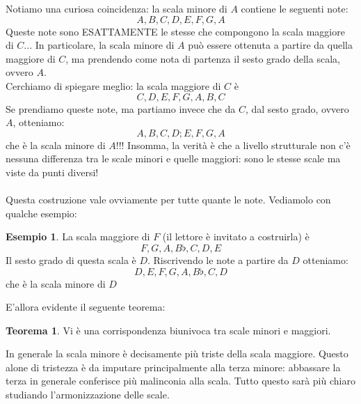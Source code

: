 \documentclass[12pt,a4paper]{report}
\theoremstyle{definition}
\theoremstyle{Theorem}
\newtheorem{Theo}[Def]{Teorema}
\theoremstyle{definition}
\newtheorem{Ex}[Def]{Esempio}
\theoremstyle{definition}
\theoremstyle{definition}
\begin{document}
	 		 Notiamo una curiosa coincidenza: la scala minore di $A$ contiene le seguenti note: 
	 		 $$A,B,C,D,E,F,G,A$$
	 		 Queste note sono ESATTAMENTE le stesse che compongono la scala maggiore di $C$... In particolare, la scala minore di $A$ può essere ottenuta a partire da quella maggiore di $C$, ma prendendo come nota di partenza il sesto grado della scala, ovvero $A$.\\
	 		 Cerchiamo di spiegare meglio: la scala maggiore di $C$ è
	 		$$C,D,E,F,G,A,B,C$$
	 		Se prendiamo queste note, ma partiamo invece che da $C$, dal sesto grado, ovvero $A$, otteniamo:
	 		$$A,B,C,D;E,F,G,A$$ che è la scala minore di $A$!!!
	 		Insomma, la verità è che a livello strutturale non c'è nessuna differenza tra le scale minori e quelle maggiori: sono le stesse scale ma viste da punti diversi!\\
	 		\\
	 		Questa costruzione vale ovviamente per tutte quante le note. Vediamolo con qualche esempio:
	 		\begin{Ex}
	 			La scala maggiore di $F$ (il lettore è invitato a costruirla) è
	 			$$F,G,A,B\flat,C,D,E$$
	 			Il sesto grado di questa scala è $D$. Riscrivendo le note a partire da $D$ otteniamo:
	 			$$D,E,F,G,A,B\flat,C,D$$
	 			che è la scala minore di $D$
	 		\end{Ex}
	 		E'allora evidente il seguente teorema:
	 		\begin{Theo}
	 			Vi è una corrispondenza biunivoca tra scale minori e maggiori.
	 		\end{Theo}
	 		In generale la scala minore è decisamente più triste della scala maggiore. Questo alone di tristezza è da imputare principalmente alla terza minore: abbassare la terza in generale conferisce più malinconia alla scala. Tutto questo sarà più chiaro studiando l'armonizzazione delle scale.
\end{document}
